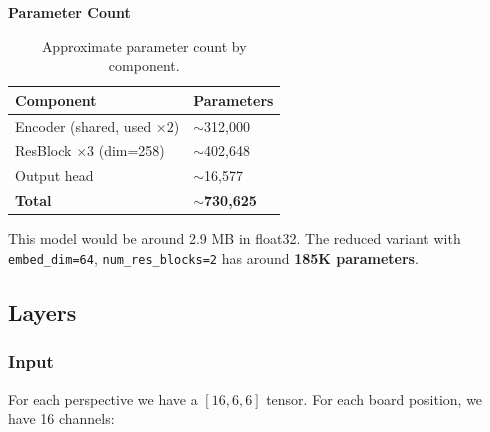 \documentclass[11pt,a4paper]{article}
\begin{document}
\textbf{Parameter Count}
\begin{table}[htbp]
  \centering
  \caption{Approximate parameter count by component.}
  \label{tab:parameter-count}
  \begin{tabular}{L{0.58\textwidth} L{0.25\textwidth}}
    \toprule
    Component & Parameters \\
    \midrule
    Encoder (shared, used $\times2$) & $\sim$312,000 \\
    ResBlock $\times3$ (dim=258) & $\sim$402,648 \\
    Output head & $\sim$16,577 \\
    \textbf{Total} & \textbf{$\sim$730,625} \\
    \bottomrule
  \end{tabular}
\end{table}

This model would be around 2.9 MB in float32.
The reduced variant with \texttt{embed\_dim=64}, \texttt{num\_res\_blocks=2} has around \textbf{185K parameters}.

\newpage
\subsection{Layers}

\subsubsection{Input}
For each perspective we have a $[16, 6, 6]$ tensor. For each board position, we have 16 channels:
\end{document}
